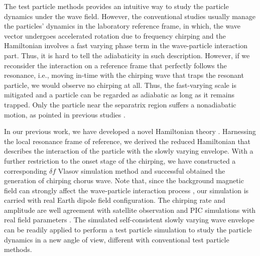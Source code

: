 The test particle methods \cite{huanghua_test_ptc,omura_test_ptc,tao_test_ptc} provides an intuitive way to study the particle dynamics under the wave field.
However, the conventional studies usually manage the particles' dynamics in the laboratory reference frame,
in which, the wave vector undergoes accelerated rotation due to frequency chirping and the Hamiltonian involves a fast varying phase term in the wave-particle interaction part. 
Thus, it is hard to tell the adiabaticity in such description.
However, if we reconsider the interaction on a reference frame that perfectly follows the resonance, i.e., moving in-time with the chirping wave that traps the resonant particle, we would observe no chirping at all. Thus, the fast-varying scale is mitigated and a particle can be regarded as adiabatic as long as it remains trapped. Only the particle near the separatrix region suffers a nonadiabatic motion, as pointed in previous studies \cite{CARY1989287}.

In our previous work, we have developed a novel Hamiltonian theory \cite{zheng2024}. 
Harnessing the local resonance frame of reference, we derived the reduced Hamiltonian that describes the interaction of the particle with the slowly varying envelope.
With a further restriction to the onset stage of the chirping, we have constructed a corresponding $\delta f$ Vlasov simulation method and successful obtained the generation of chirping chorus wave.
Note that, since the background magnetic field can strongly affect the wave-particle interaction process \cite{wu2023,wu_controlling_2020}, our simulation is carried with real Earth dipole field configuration.
The chirping rate and amplitude are well agreement with satellite observation \cite{cully_observational_2011} and PIC simulations with real field parameters \cite{katoh2016}.
The simulated self-consistent slowly varying wave envelope can be readily applied to perform a test particle simulation to study the particle dynamics in a new angle of view, different with conventional test particle methods. 

